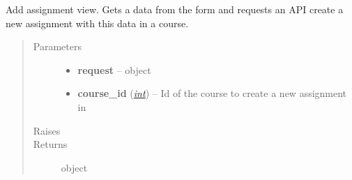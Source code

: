 \documentclass[letterpaper,10pt,english]{sphinxmanual}
\begin{document}

\begin{fulllineitems}
\label{web_portal:core.courses.views.add_assignment}
Add assignment view. Gets a data from the form and requests an API create a
new assignment with this data in a course.
\begin{quote}\begin{description}
\item[{Parameters}] \leavevmode\begin{itemize}
\item {} 
\textbf{request} --  object

\item {} 
\textbf{course\_id} (\href{http://docs.python.org/library/functions.html\#int}{\emph{int}}) -- Id of the course to create a new assignment in

\end{itemize}

\item[{Raises}] \leavevmode
{}

\item[{Returns}] \leavevmode
{} object

\end{description}\end{quote}

\end{fulllineitems}

\end{document}
